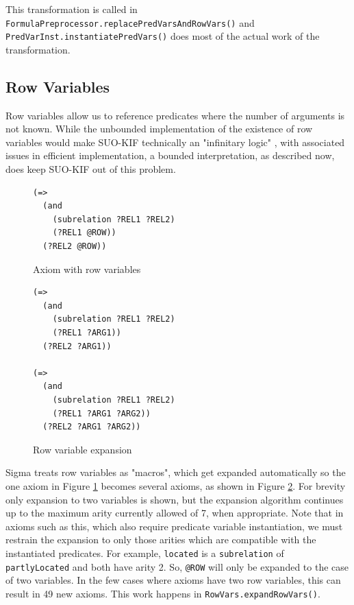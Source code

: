 \documentclass{book}
\begin{document}
\begin{sloppypar}
This transformation is called in \texttt{FormulaPreprocessor.replacePredVarsAndRowVars()}
and \texttt{PredVarInst.instantiatePredVars()} 
does most of the actual work of the
transformation.
\end{sloppypar}

\subsection{Row Variables}
\label{chap:KnowRep:subsec:RowVar}

\begin{sloppypar}
Row variables allow us to reference predicates where the
number of arguments is not known. While the unbounded implementation of the
existence of row variables would make SUO-KIF technically an "infinitary logic"
\cite{hayes2001}, with associated issues in efficient implementation, a bounded
interpretation, as described now, does keep SUO-KIF out of this problem.
\end{sloppypar}

\begin{figure}
\begin{framed}
\label{fig:RowVar}
\begin{verbatim}
(=>
  (and
    (subrelation ?REL1 ?REL2)
    (?REL1 @ROW))
  (?REL2 @ROW))
\end{verbatim}
\caption{Axiom with row variables}
\end{framed} 
\end{figure}

\begin{figure}
\begin{framed}
\label{fig:RowExpand}
\begin{verbatim}
(=>
  (and
    (subrelation ?REL1 ?REL2)
    (?REL1 ?ARG1))
  (?REL2 ?ARG1))

(=>
  (and
    (subrelation ?REL1 ?REL2)
    (?REL1 ?ARG1 ?ARG2))
  (?REL2 ?ARG1 ?ARG2))
\end{verbatim}
\caption{Row variable expansion}
\end{framed} 
\end{figure}

Sigma treats row variables as "macros", which get expanded
automatically so the one axiom in Figure \ref{fig:RowVar} becomes several
axioms, as shown in Figure \ref{fig:RowExpand}.  For brevity only expansion to
two variables is shown, but the expansion algorithm continues up to the maximum
arity currently allowed of 7, when appropriate.  Note that in axioms such as
this, which also require predicate variable instantiation, we must restrain the
expansion to only those arities which are compatible with the instantiated
predicates.  For example,  \texttt{located} is a
 \texttt{subrelation} of  {\tt
partlyLocated} and both have arity 2.  So, {\tt @ROW} will only be expanded to
the case of two variables. In the few cases where axioms have two row variables,
this can result in 49 new axioms.  This work happens in 
\texttt{RowVars.expandRowVars()}.
\end{document}
